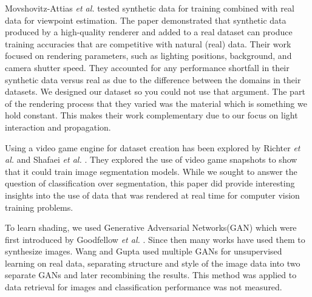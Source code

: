 \documentclass[10pt,twocolumn,letterpaper]{article}
\begin{document}
Movshovitz-Attias \textit{et al.} \cite{DBLP:journals/corr/Movshovitz-Attias16} tested synthetic data for training combined with real data for viewpoint estimation. The paper demonstrated that synthetic data produced by a high-quality renderer and added to a real dataset can produce training accuracies that are competitive with natural (real) data. Their work focused on rendering parameters, such as lighting positions, background, and camera shutter speed. They accounted for any performance shortfall in their synthetic data versus real as due to the difference between the domains in their datasets.  We designed our dataset so you could not use that argument. The part of the rendering process that they varied was the material which is something we hold constant. This makes their work complementary due to our focus on light interaction and propagation.

Using a video game engine for dataset creation has been explored by Richter \textit{et al.} \cite{DBLP:journals/corr/RichterVRK16} and  Shafaei \textit{et al.} \cite{DBLP:journals/corr/ShafaeiLS16}. They explored the use of video game snapshots to show that it could train image segmentation models. While we sought to answer the question of classification over segmentation, this paper did provide interesting insights into the use of data that was rendered at real time for computer vision training problems.


To learn shading, we used Generative Adversarial Networks(GAN) which were first introduced by Goodfellow \textit{et al.} \cite{goodfellow}. Since then many works have used them to synthesize images. Wang and Gupta \cite{DBLP:journals/corr/WangG16} used multiple GANs for unsupervised learning on real data, separating structure and style of the image data into two separate GANs and later recombining the results. This method was applied to data retrieval for images and classification performance was not measured.
\end{document}

